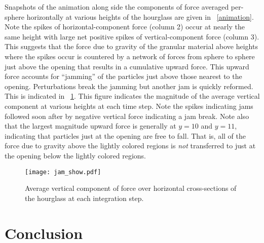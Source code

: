 \documentclass[12pt]{amsart}
\newcommand{\figref}[1]{\figurename~\ref{#1}}
\begin{document}
Snapshots of the animation along side the components of force averaged
per-sphere horizontally at various heights of the hourglass are given in
\figref{animation}.  Note the spikes of horizontal-component force (column 2)
occur at nearly the same height with large net positive spikes of
vertical-component force (column 3).  This suggests that the force due to
gravity of the granular material above heights where the spikes occur is
countered by a network of forces from sphere to sphere just above the opening
that results in a cumulative upward force.  This upward force  accounts for
``jamming'' of the particles just above those nearest to the opening.
Perturbations break the jamming but another jam is quickly reformed.  This is
indicated in \figref{jam}.  This figure indicates the magnitude of the average
vertical component at various heights at each time step.  Note the spikes
indicating jams followed soon after by negative vertical force indicating a jam break.
Note also that the largest magnitude upward force is generally at $y=10$ and $y=11$,
indicating that particles just at the opening are free to fall.  That is, all 
of the force due to gravity above the lightly colored regions is \emph{not} transferred
to just at the opening below the lightly colored regions. 
\begin{figure}[h]
\texttt{[image: jam\_show.pdf]}
\caption{ Average vertical component of force over horizontal cross-sections of the hourglass at each integration step. }
\label{jam}
\end{figure}
\section{Conclusion}
\end{document}
